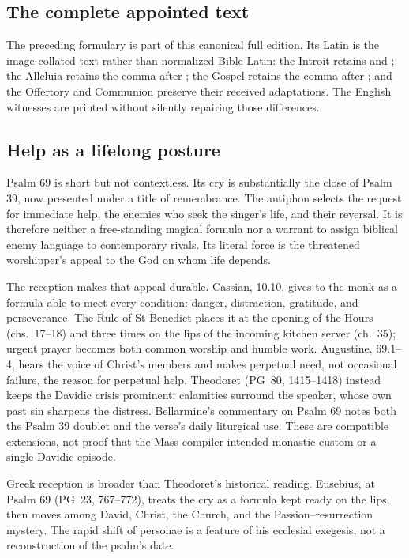 \subsection*{The complete appointed text}

The preceding formulary is part of this canonical full edition. Its Latin is
the image-collated text rather than normalized Bible Latin: the Introit retains
 and ; the Alleluia retains the comma after
; the Gospel retains the comma after ; and
the Offertory and Communion preserve their received adaptations. The English
witnesses are printed without silently repairing those differences.

\elementguard
\subsection*{Help as a lifelong posture }

Psalm 69 is short but not contextless. Its cry is substantially the close of
Psalm 39, now presented under a title of remembrance. The antiphon selects the
request for immediate help, the enemies who seek the singer's life, and their
reversal. It is therefore neither a free-standing magical formula nor a warrant
to assign biblical enemy language to contemporary rivals. Its literal force is
the threatened worshipper's appeal to the God on whom life depends.

The reception makes that appeal durable. Cassian,  10.10,
gives  to the monk as a formula able to meet every
condition: danger, distraction, gratitude, and perseverance. The Rule of St
Benedict places it at the opening of the Hours (chs.~17--18) and three times on
the lips of the incoming kitchen server (ch.~35); urgent prayer becomes both
common worship and humble work. Augustine,  69.1--4,
hears the voice of Christ's members and makes perpetual need, not occasional
failure, the reason for perpetual help. Theodoret (PG~80, 1415--1418) instead
keeps the Davidic crisis prominent: calamities surround the speaker, whose own
past sin sharpens the distress. Bellarmine's commentary on Psalm 69 notes both
the Psalm 39 doublet and the verse's daily liturgical use. These are compatible
extensions, not proof that the Mass compiler intended monastic custom or a
single Davidic episode.

Greek reception is broader than Theodoret's historical reading. Eusebius,
 at Psalm 69 (PG~23, 767--772), treats the cry
as a formula kept ready on the lips, then moves among David, Christ, the
Church, and the Passion--resurrection mystery. The rapid shift of personae is
a feature of his ecclesial exegesis, not a reconstruction of the psalm's date.

